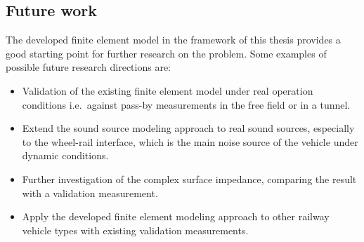 \subsection*{Future work}
The developed finite element model in the framework of this thesis provides a good starting point for further research on the problem. Some examples of possible future research directions are:
\begin{itemize}
	\item Validation of the existing finite element model under real operation conditions i.e.\ against pass-by measurements in the free field or in a tunnel.
	\item Extend the sound source modeling approach to real sound sources, especially to the wheel-rail interface, which is the main noise source of the vehicle under dynamic conditions.
	\item Further investigation of the complex surface impedance, comparing the result with a validation measurement.
	\item Apply the developed finite element modeling approach to other railway vehicle types with existing validation measurements.
\end{itemize}
